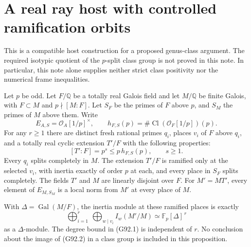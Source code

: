 \section{A real ray host with controlled ramification orbits}
\label{sec:cubic-genus-host-research}

This is a compatible host construction for a proposed genus-class
argument.  The required isotypic quotient of the \(p\)-split class group
is not proved in this note.  In particular, this note alone supplies
neither strict class positivity nor the numerical frame inequalities.

\begin{proposition}
\label{AC-G92-host}
Let \(p\) be odd.  Let \(F/\mathbb Q\) be a totally real Galois field
and let \(M/\mathbb Q\) be finite Galois, with \(F\subset M\) and
\(p\nmid[M:F]\).  Let \(S_F\) be the primes of \(F\) above \(p\), and
\(S_M\) the primes of \(M\) above them.  Write
\[
 E_{A,S}=\mathcal O_A[1/p]^\times,\qquad
 h_{F,S}(p)=\#\operatorname{Cl}(\mathcal O_F[1/p])(p).
\]
For any \(r\geq1\) there are distinct fresh rational primes \(q_i\),
places \(v_i\) of \(F\) above \(q_i\), and a totally real cyclic
extension \(T'/F\) with the following properties:
\[
 [T':F]=p^s\leq p\,h_{F,S}(p),\qquad s\geq1.
 \tag{G92.1}
\]
Every \(q_i\) splits completely in \(M\).  The extension \(T'/F\)
is ramified only at the selected \(v_i\), with inertia exactly of
order \(p\) at each, and every place in \(S_F\) splits completely.
The fields \(T'\) and \(M\) are linearly disjoint over \(F\).
For \(M'=MT'\), every element of \(E_{M,S_M}\) is a local norm
from \(M'\) at every place of \(M\).

With \(\Delta=\operatorname{Gal}(M/F)\), the inertia module at these
ramified places is exactly
\[
 \bigoplus_{i=1}^r\ \bigoplus_{w\mid v_i}I_w(M'/M)
       \simeq \mathbb F_p[\Delta]^{\,r}
 \tag{G92.2}
\]
as a \(\Delta\)-module.  The degree bound in (G92.1) is independent
of \(r\).  No conclusion about the image of (G92.2) in a class
group is included in this proposition.
\end{proposition}

